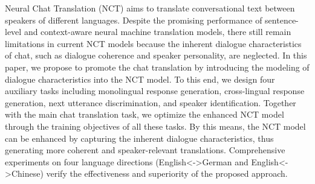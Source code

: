 Neural Chat Translation (NCT) aims to translate conversational text between speakers of different languages. Despite the promising performance of sentence-level and context-aware neural machine translation models, there still remain limitations in current NCT models because the inherent dialogue characteristics of chat, such as dialogue coherence and speaker personality, are neglected. In this paper, we propose to promote the chat translation by introducing the modeling of dialogue characteristics into the NCT model. To this end, we design four auxiliary tasks including monolingual response generation, cross-lingual response generation, next utterance discrimination, and speaker identification. Together with the main chat translation task, we optimize the enhanced NCT model through the training objectives of all these tasks. By this means, the NCT model can be enhanced by capturing the inherent dialogue characteristics, thus generating more coherent and speaker-relevant translations. Comprehensive experiments on four language directions (English<->German and English<->Chinese) verify the effectiveness and superiority of the proposed approach.
